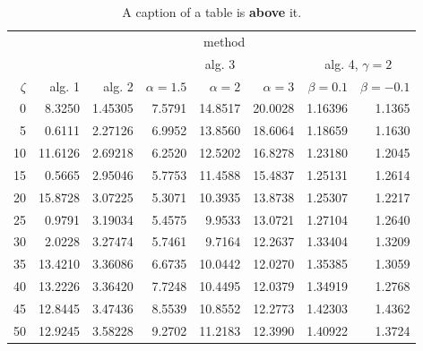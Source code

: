 \documentclass[a4paper,twoside,12pt]{book}
\begin{document}
 
\begin{table}
\centering
\caption{A caption of a table is \textbf{above} it.}
\label{id:tab:wyniki}
\begin{tabular}{rrrrrrrr}
\toprule
	         &                                     \multicolumn{7}{c}{method}                                      \\
	         \cmidrule{2-8}
	         &         &         &        \multicolumn{3}{c}{alg. 3}        & \multicolumn{2}{c}{alg. 4, $\gamma = 2$} \\
	         \cmidrule(r){4-6}\cmidrule(r){7-8}
	$\zeta$ &     alg. 1 &   alg. 2 & $\alpha= 1.5$ & $\alpha= 2$ & $\alpha= 3$ &   $\beta = 0.1$  &   $\beta = -0.1$ \\
\midrule
	       0 &  8.3250 & 1.45305 &       7.5791 &    14.8517 &    20.0028 & 1.16396 &                       1.1365 \\
	       5 &  0.6111 & 2.27126 &       6.9952 &    13.8560 &    18.6064 & 1.18659 &                       1.1630 \\
	      10 & 11.6126 & 2.69218 &       6.2520 &    12.5202 &    16.8278 & 1.23180 &                       1.2045 \\
	      15 &  0.5665 & 2.95046 &       5.7753 &    11.4588 &    15.4837 & 1.25131 &                       1.2614 \\
	      20 & 15.8728 & 3.07225 &       5.3071 &    10.3935 &    13.8738 & 1.25307 &                       1.2217 \\
	      25 &  0.9791 & 3.19034 &       5.4575 &     9.9533 &    13.0721 & 1.27104 &                       1.2640 \\
	      30 &  2.0228 & 3.27474 &       5.7461 &     9.7164 &    12.2637 & 1.33404 &                       1.3209 \\
	      35 & 13.4210 & 3.36086 &       6.6735 &    10.0442 &    12.0270 & 1.35385 &                       1.3059 \\
	      40 & 13.2226 & 3.36420 &       7.7248 &    10.4495 &    12.0379 & 1.34919 &                       1.2768 \\
	      45 & 12.8445 & 3.47436 &       8.5539 &    10.8552 &    12.2773 & 1.42303 &                       1.4362 \\
	      50 & 12.9245 & 3.58228 &       9.2702 &    11.2183 &    12.3990 & 1.40922 &                       1.3724 \\
\bottomrule
\end{tabular}
\end{table}  
\end{document}
